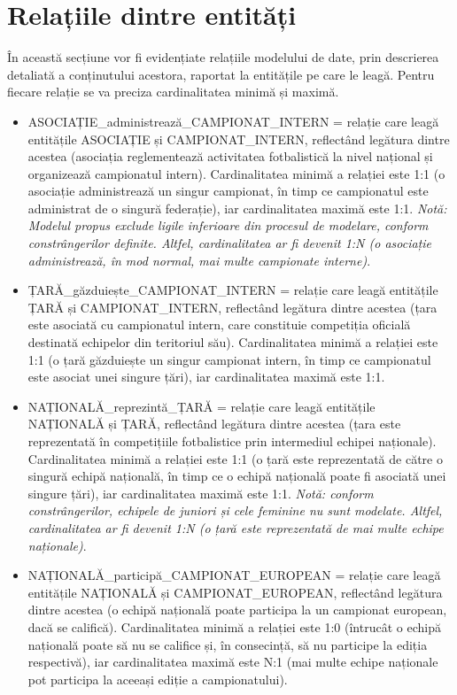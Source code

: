 \documentclass{article}
\begin{document}
	\newpage
	
	\section{Relațiile dintre entități}
	
	În această secțiune vor fi evidențiate relațiile modelului de date, prin descrierea detaliată a conținutului acestora, raportat la entitățile pe care le leagă. Pentru fiecare relație se va preciza cardinalitatea minimă și maximă. 
	
	\begin{itemize}
	\item ASOCIAȚIE\_administrează\_CAMPIONAT\_INTERN = relație care leagă entitățile ASOCIAȚIE și CAMPIONAT\_INTERN, reflectând legătura dintre acestea (asociația reglementează activitatea fotbalistică la nivel național și organizează campionatul intern). Cardinalitatea minimă a relației este 1:1 (o asociație administrează un singur campionat, în timp ce campionatul este administrat de o singură federație), iar cardinalitatea maximă este 1:1. 
	\textit{Notă: Modelul propus exclude ligile inferioare din procesul de modelare, conform constrângerilor definite. Altfel, cardinalitatea ar fi devenit 1:N (o asociație administrează, în mod normal, mai multe campionate interne)}.
	
	\item ȚARĂ\_găzduiește\_CAMPIONAT\_INTERN = relație care leagă entitățile ȚARĂ și CAMPIONAT\_INTERN, reflectând legătura dintre acestea (țara este asociată cu campionatul intern, care constituie competiția oficială destinată echipelor din teritoriul său). Cardinalitatea minimă a relației este 1:1 (o țară găzduiește un singur campionat intern, în timp ce campionatul este asociat unei singure țări), iar cardinalitatea maximă este 1:1.
	
	\item NAȚIONALĂ\_reprezintă\_ȚARĂ = relație care leagă entitățile NAȚIONALĂ și ȚARĂ, reflectând legătura dintre acestea (țara este reprezentată în competițiile fotbalistice prin intermediul echipei naționale). Cardinalitatea minimă a relației este 1:1 (o țară este reprezentată de către o singură echipă națională, în timp ce o echipă națională poate fi asociată unei singure țări), iar cardinalitatea maximă este 1:1.
	\textit{Notă: conform constrângerilor, echipele de juniori și cele feminine nu sunt modelate. Altfel, cardinalitatea ar fi devenit 1:N (o țară este reprezentată de mai multe echipe naționale)}.
	
	\item NAȚIONALĂ\_participă\_CAMPIONAT\_EUROPEAN = relație care leagă entitățile NAȚIONALĂ și CAMPIONAT\_EUROPEAN, reflectând legătura dintre acestea (o echipă națională poate participa la un campionat european, dacă se califică). Cardinalitatea minimă a relației este 1:0 (întrucât o echipă națională poate să nu se califice și, în consecință, să nu participe la ediția respectivă), iar cardinalitatea maximă este N:1 (mai multe echipe naționale pot participa la aceeași ediție a campionatului).
	

\end{itemize}
\end{document}
